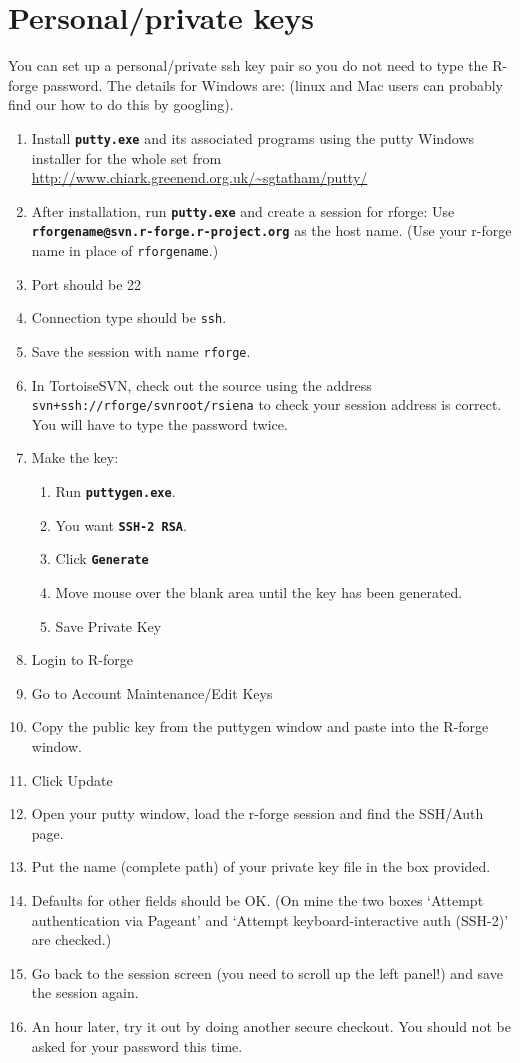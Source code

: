 \documentclass[12pt, a4paper]{article}
\renewcommand{\=}{\,=\,}
\newcommand{\+}{\,+\,}
\newcommand{\sfn}[1]{\textbf{\texttt{#1}}}
\begin{document}
\section{Personal/private keys}
\label{key}
You can set up a personal/private ssh key pair so you do not need to type the
R-forge password. The details for Windows are: (linux and Mac users can probably
find our how to do this by googling).
\begin{enumerate}
\item Install \sfn{putty.exe} and its associated programs using the putty
  Windows installer for the whole set from
  {\small{\url{http://www.chiark.greenend.org.uk/~sgtatham/putty/}}}
\item After installation, run \sfn{putty.exe} and create a session for rforge:
Use \sfn{rforgename@svn.r-forge.r-project.org} as the host name. (Use your
r-forge name in place of \verb|rforgename|.)
\item Port should be 22
\item Connection type should be \verb|ssh|.
\item Save the session with name \verb|rforge|.
\item In TortoiseSVN, check out the source using the address
  \verb|svn+ssh://rforge/svnroot/rsiena| to check your session address is
  correct. You will have to type the password twice.
\item Make the key:
\begin{enumerate}
\item Run \sfn{puttygen.exe}.
\item You want \sfn{SSH-2 RSA}.
\item Click \sfn{Generate}
\item Move mouse over the blank area until the key has been generated.
\item Save Private Key
\end{enumerate}
\item Login to R-forge
\item Go to Account Maintenance/Edit Keys
\item Copy the public key from the puttygen window and paste into the R-forge
  window.
\item Click Update
\item Open your putty window, load the r-forge session and find the SSH/Auth
  page.
\item Put the name (complete path) of your private key file in the box provided.
\item Defaults for other fields should be OK. (On mine the two boxes  `Attempt
  authentication via Pageant' and `Attempt keyboard-interactive auth (SSH-2)'
  are checked.)
\item Go back to the session screen (you need to scroll up the left panel!) and
  save the session again.
\item An hour later, try it out by doing another secure checkout. You should not
  be asked for your password this time.
\end{enumerate}
\end{document}

